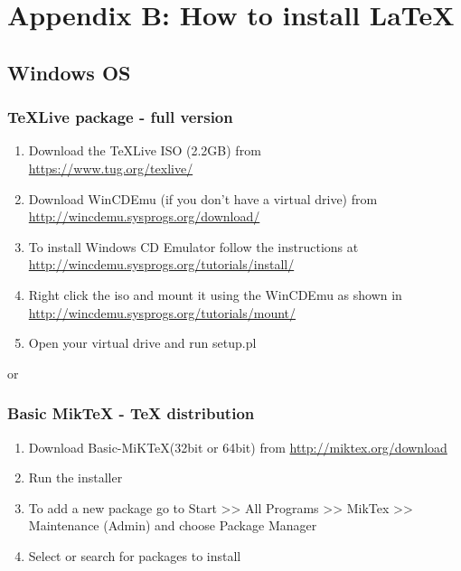 
\chapter{Appendix B: How to install \LaTeX} 

\section*{Windows OS}

\subsection*{TeXLive package - full version}
\begin{enumerate}
\item	Download the TeXLive ISO (2.2GB) from\\
\href{https://www.tug.org/texlive/}{https://www.tug.org/texlive/}
\item	Download WinCDEmu (if you don't have a virtual drive) from \\
\href{http://wincdemu.sysprogs.org/download/}{http://wincdemu.sysprogs.org/download/}
\item	To install Windows CD Emulator follow the instructions at\\
\href{http://wincdemu.sysprogs.org/tutorials/install/}{http://wincdemu.sysprogs.org/tutorials/install/}
\item	Right click the iso and mount it using the WinCDEmu as shown in \\
\href{http://wincdemu.sysprogs.org/tutorials/mount/}{http://wincdemu.sysprogs.org/tutorials/mount/}
\item	Open your virtual drive and run setup.pl
\end{enumerate}

or

\subsection*{Basic MikTeX - TeX distribution}
\begin{enumerate}
\item	Download Basic-MiK\TeX (32bit or 64bit) from \href{http://miktex.org/download}{http://miktex.org/download}
\item	Run the installer 
\item	To add a new package go to Start >> All Programs >> MikTex >> Maintenance (Admin) and choose Package Manager
\item	Select or search for packages to install
\end{enumerate}

